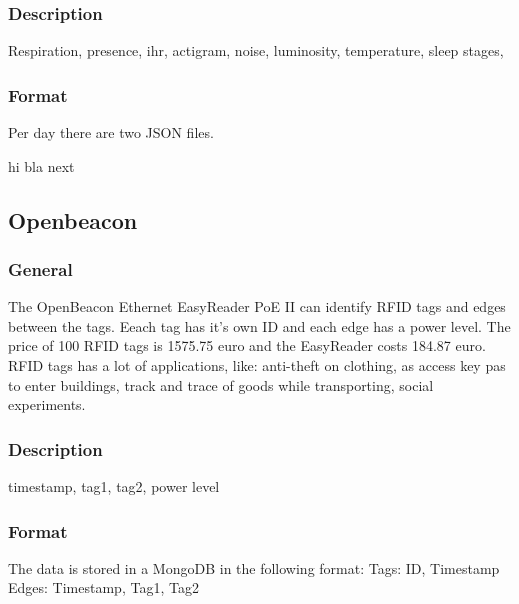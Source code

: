 			\subsubsection{Description}
				Respiration, presence, ihr, actigram, noise, luminosity, temperature, sleep stages, 
			\subsubsection{Format}
			Per day there are two JSON files.
			\begin{algorithm}
				\SetAlgoLined
				hi\;
				bla next
			\end{algorithm}
	\subsection{Openbeacon}
		\subsubsection{General}
			The OpenBeacon Ethernet EasyReader PoE II can identify RFID tags and edges between the tags. Eeach tag has it's own ID and each edge has a power level. The price of 100 RFID tags is 1575.75 euro and the EasyReader costs 184.87 euro. RFID tags has a lot of applications, like: anti-theft on clothing, as access key pas to enter buildings, track and trace of goods while transporting, social experiments.
		\subsubsection{Description}
		timestamp, tag1, tag2, power level

		\subsubsection{Format}
		The data is stored in a MongoDB in the following format:
		Tags: ID, Timestamp
		Edges: Timestamp, Tag1, Tag2
